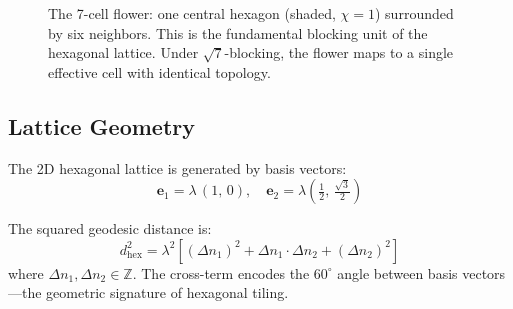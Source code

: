 \documentclass[12pt,a4paper]{article}
\theoremstyle{plain}
\theoremstyle{definition}
\begin{document}
\begin{figure}[H]
\centering
{}
\caption{The 7-cell flower: one central hexagon (shaded, $\chi = 1$) surrounded by six neighbors. This is the fundamental blocking unit of the hexagonal lattice. Under $\sqrt{7}$-blocking, the flower maps to a single effective cell with identical topology.}
\label{fig:flower}
\end{figure}

\subsection{Lattice Geometry}

The 2D hexagonal lattice is generated by basis vectors:
\begin{equation}
\mathbf{e}_1 = \lambda\,(1,\, 0), \quad \mathbf{e}_2 = \lambda\left(\tfrac{1}{2},\, \tfrac{\sqrt{3}}{2}\right)
\end{equation}

The squared geodesic distance is:
\begin{equation}\label{eq:hex-metric}
d^2_{\mathrm{hex}} = \lambda^2\left[(\Delta n_1)^2 + \Delta n_1 \cdot \Delta n_2 + (\Delta n_2)^2\right]
\end{equation}
where $\Delta n_1, \Delta n_2 \in \mathbb{Z}$. The cross-term encodes the $60^\circ$ angle between basis vectors---the geometric signature of hexagonal tiling.
\end{document}
